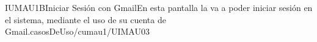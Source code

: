 
\begin{IU}{IUMAU1B}{Iniciar Sesión con Gmail}{En esta pantalla la  va a poder iniciar sesión en el sistema, mediante el uso de su cuenta de Gmail.}{casosDeUso/cumau1/UIMAU03}
\end{IU}
